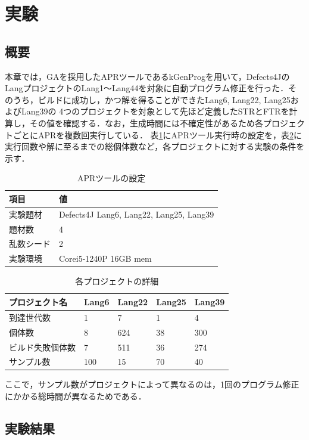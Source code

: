 \documentclass[uplatex,dvipdfmx,a4paper]{jsarticle}
\let\oldcite\cite
\renewcommand{\cite}[1]{\xspace\oldcite{#1}}
\begin{document}
\section{実験} \label{sec:exp}
\subsection{概要}
本章では，GAを採用したAPRツールであるkGenProg\cite{higo2018kgenprog}を用いて，Defects4J\cite{just2014defects4j}のLangプロジェクトのLang1～Lang44を対象に自動プログラム修正を行った．そのうち，ビルドに成功し，かつ解を得ることができたLang6, 
 Lang22, Lang25およびLang39の
4つのプロジェクトを対象として先ほど定義したSTRとFTRを計算し，その値を確認する．なお，生成時間には不確定性があるため各プロジェクトごとにAPRを複数回実行している．
表\ref{tab:apr_setting}にAPRツール実行時の設定を，表\ref{tab:project_setting}に実行回数や解に至るまでの総個体数など，各プロジェクトに対する実験の条件を示す．
\begin{table}[b]
  \centering
  \caption{APRツールの設定}
  \label{tab:apr_setting}
  \begin{tabular}{ll} \hline\hline
    項目         & 値                           \\\hline
    実験題材     & Defects4J Lang6, Lang22, Lang25, Lang39 \\
    題材数       & 4                           \\
    乱数シード   & 2       \\
    実験環境     & Corei5-1240P 16GB mem  \\\hline\hline
  \end{tabular}
\end{table}
\begin{table}[b]
  \centering
  \caption{各プロジェクトの詳細}
  \label{tab:project_setting}
  \begin{tabular}{lllll} \hline\hline
    プロジェクト名 & Lang6 & Lang22 & Lang25 & Lang39  \\\hline
    到達世代数 & 1 & 7 & 1 & 4 \\
    個体数 & 8 & 624 & 38 & 300 \\
    ビルド失敗個体数 & 7 & 511 & 36 & 274 \\
    サンプル数 & 100 & 15 & 70 & 40 \\\hline\hline
  \end{tabular}
\end{table}
ここで，サンプル数がプロジェクトによって異なるのは，1回のプログラム修正にかかる総時間が異なるためである．
\subsection{実験結果}
\end{document}
